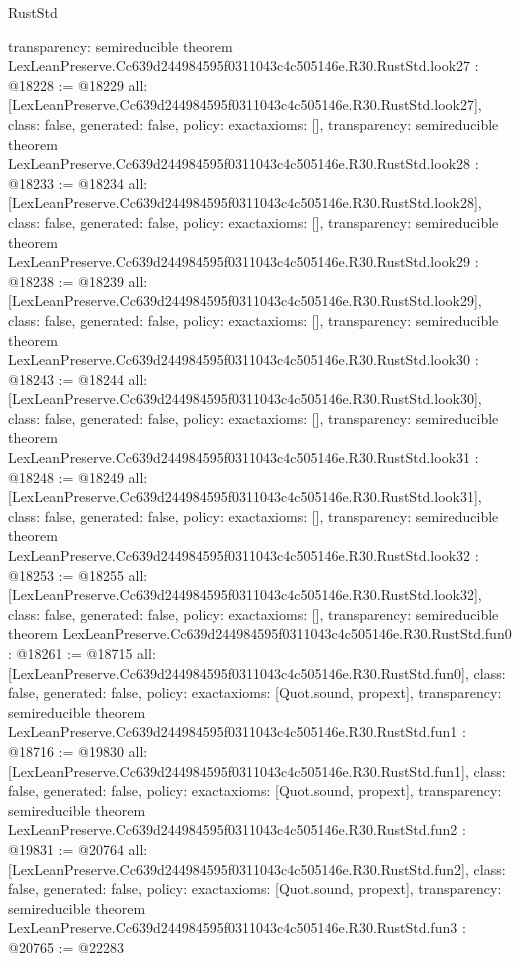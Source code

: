 \begin{lexlean}{RustStd}
\begin{coremodule}
{  transparency: semireducible
}
theorem LexLeanPreserve.Cc639d244984595f0311043c4c505146e.R30.RustStd.look27 : @18228 := @18229 {
  all: [LexLeanPreserve.Cc639d244984595f0311043c4c505146e.R30.RustStd.look27],
  class: false,
  generated: false,
  policy: exact{axioms: []},
  transparency: semireducible
}
theorem LexLeanPreserve.Cc639d244984595f0311043c4c505146e.R30.RustStd.look28 : @18233 := @18234 {
  all: [LexLeanPreserve.Cc639d244984595f0311043c4c505146e.R30.RustStd.look28],
  class: false,
  generated: false,
  policy: exact{axioms: []},
  transparency: semireducible
}
theorem LexLeanPreserve.Cc639d244984595f0311043c4c505146e.R30.RustStd.look29 : @18238 := @18239 {
  all: [LexLeanPreserve.Cc639d244984595f0311043c4c505146e.R30.RustStd.look29],
  class: false,
  generated: false,
  policy: exact{axioms: []},
  transparency: semireducible
}
theorem LexLeanPreserve.Cc639d244984595f0311043c4c505146e.R30.RustStd.look30 : @18243 := @18244 {
  all: [LexLeanPreserve.Cc639d244984595f0311043c4c505146e.R30.RustStd.look30],
  class: false,
  generated: false,
  policy: exact{axioms: []},
  transparency: semireducible
}
theorem LexLeanPreserve.Cc639d244984595f0311043c4c505146e.R30.RustStd.look31 : @18248 := @18249 {
  all: [LexLeanPreserve.Cc639d244984595f0311043c4c505146e.R30.RustStd.look31],
  class: false,
  generated: false,
  policy: exact{axioms: []},
  transparency: semireducible
}
theorem LexLeanPreserve.Cc639d244984595f0311043c4c505146e.R30.RustStd.look32 : @18253 := @18255 {
  all: [LexLeanPreserve.Cc639d244984595f0311043c4c505146e.R30.RustStd.look32],
  class: false,
  generated: false,
  policy: exact{axioms: []},
  transparency: semireducible
}
theorem LexLeanPreserve.Cc639d244984595f0311043c4c505146e.R30.RustStd.fun0 : @18261 := @18715 {
  all: [LexLeanPreserve.Cc639d244984595f0311043c4c505146e.R30.RustStd.fun0],
  class: false,
  generated: false,
  policy: exact{axioms: [Quot.sound, propext]},
  transparency: semireducible
}
theorem LexLeanPreserve.Cc639d244984595f0311043c4c505146e.R30.RustStd.fun1 : @18716 := @19830 {
  all: [LexLeanPreserve.Cc639d244984595f0311043c4c505146e.R30.RustStd.fun1],
  class: false,
  generated: false,
  policy: exact{axioms: [Quot.sound, propext]},
  transparency: semireducible
}
theorem LexLeanPreserve.Cc639d244984595f0311043c4c505146e.R30.RustStd.fun2 : @19831 := @20764 {
  all: [LexLeanPreserve.Cc639d244984595f0311043c4c505146e.R30.RustStd.fun2],
  class: false,
  generated: false,
  policy: exact{axioms: [Quot.sound, propext]},
  transparency: semireducible
}
theorem LexLeanPreserve.Cc639d244984595f0311043c4c505146e.R30.RustStd.fun3 : @20765 := @22283 {
}
\end{coremodule}
\end{lexlean}

